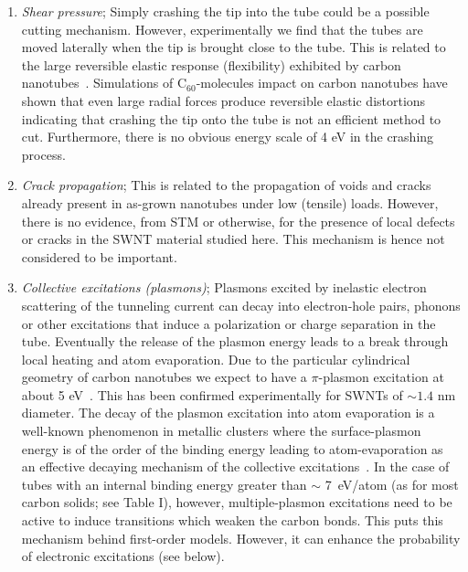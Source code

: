 \begin{multicols}{2}

\begin{enumerate}
\item {\it Shear pressure};
Simply crashing the tip into the tube could be a possible cutting
mechanism. However, experimentally we find that the tubes are
moved laterally when the tip is brought close to the tube. This is
related to the large reversible elastic response (flexibility)
exhibited by carbon nanotubes~\cite{falvo98}. Simulations of
C$_{60}$-molecules impact on carbon nanotubes have shown that even
large radial forces produce reversible elastic distortions
indicating that crashing the tip onto the tube is not an efficient
method to cut\cite{ar1}. Furthermore, there is no obvious energy
scale of 4 eV in the crashing process.

\item  {\it Crack propagation}; This is related to the propagation of
voids and cracks already present in as-grown nanotubes under low
(tensile) loads. However, there is no evidence, from STM or
otherwise, for the presence of local defects or cracks in the SWNT
material studied here. This mechanism is hence not considered to
be important.

\item  {\it Collective excitations (plasmons)};
Plasmons excited by inelastic electron scattering of the tunneling
current  can decay into electron-hole pairs, phonons or other excitations
that induce a polarization or charge separation in the tube.
Eventually the release of the plasmon energy leads to a break
through local heating and atom evaporation. Due to the particular
cylindrical geometry of carbon nanotubes we expect to have a $\pi
$-plasmon excitation at about 5 eV~\cite{plasmon}. This has been
confirmed experimentally \cite{Pichler} for SWNTs of $\sim 1.4$ nm
diameter. The decay of the plasmon excitation into atom
evaporation is a well-known phenomenon in metallic clusters where
the surface-plasmon energy is of the order of the binding energy
leading to atom-evaporation as an effective decaying mechanism of
the collective excitations~\cite{Heer}. In the case of tubes with
an internal binding energy greater than $\sim$ 7~eV/atom (as for
most carbon solids; see Table I), however, multiple-plasmon
excitations need to be active to induce transitions which  weaken
the carbon bonds. This puts this mechanism behind first-order
models. However, it can enhance the probability of electronic
excitations (see below).


\end{enumerate}
\end{multicols}
